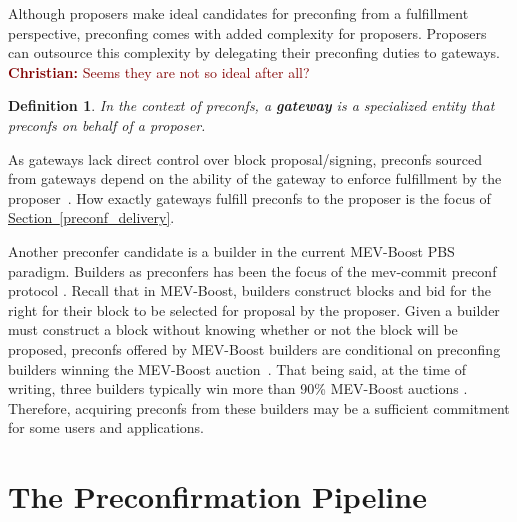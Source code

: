 \documentclass[a4paper]{article}
\theoremstyle{boldstyle}
\newtheorem{definitionx}{Definition}
\newenvironment{definition}
  {\begin{defopenboxq}\begin{definitionx}}
  {\end{definitionx}\end{defopenboxq}}
\newcommand{\chm}[1]{\textcolor{Maroon}{\textbf{Christian:} #1}}
\begin{document}
        Although proposers make ideal candidates for preconfing from a fulfillment perspective, preconfing comes with added complexity for proposers. Proposers can outsource this complexity by delegating their preconfing duties to gateways. \chm{Seems they are not so ideal after all?}
        \begin{definition}
        \label{def:preconfirmation}
        In the context of preconfs, a \textbf{gateway} is a specialized entity that preconfs on behalf of a proposer.
        \end{definition}
        As gateways lack direct control over block proposal/signing, preconfs sourced from gateways depend on the ability of the gateway to enforce fulfillment by the proposer~\cite{W:ThePreconfirmationGatewayUnlockingPreconfirmations:FromUsertoPreconfer, W:Ahead-of-TimeBlockAuctionsToEnableExecutionPreconfirmations,W:DelegationinBolt:OutsourcingSophisticationWhilePreservingDecentralization}. How exactly gateways fulfill preconfs to the proposer is the focus of \hyperref[preconf_delivery]{Section~\ref{preconf_delivery}}.
        
        Another preconfer candidate is a builder in the current MEV-Boost PBS paradigm. Builders as preconfers has been the focus of the mev-commit preconf protocol \cite{W:Documentation-Understandingmev-commit}.  Recall that in MEV-Boost, builders construct blocks and bid for the right for their block to be selected for proposal by the proposer. Given a builder must construct a block without knowing whether or not the block will be proposed, preconfs offered by MEV-Boost builders are conditional on preconfing builders winning the MEV-Boost auction~\cite{W:PreconfirmationFairExchange,W:LeaderlessandLeader-BasedPreconfirmations}. That being said,
        at the time of writing, three builders typically win more than 90\% MEV-Boost auctions \cite{MEV.pics}. Therefore, acquiring preconfs from these builders may be a sufficient commitment for some users and applications. 
    
\section{The Preconfirmation Pipeline}
\end{document}
